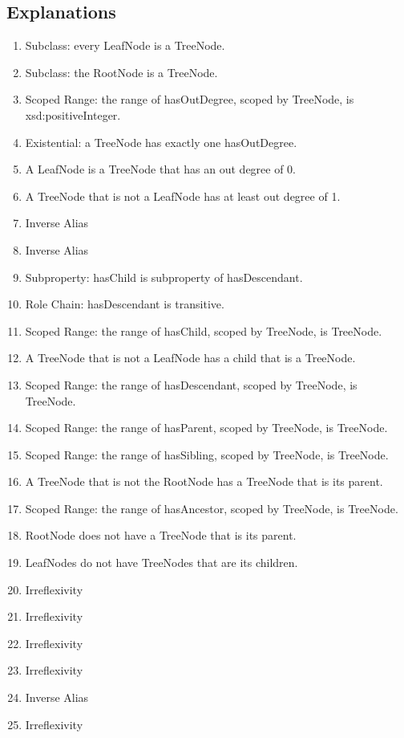 \subsection{Explanations}
\label{exp:Tree}
\begin{enumerate}
\item Subclass: every \textsf{LeafNode} is a \textsf{TreeNode}.
\item Subclass: the \textsf{RootNode} is a \textsf{TreeNode}.
\item Scoped Range: the range of \textsf{hasOutDegree}, scoped by \textsf{TreeNode}, is \textsf{xsd:positiveInteger}.
\item Existential: a \textsf{TreeNode} has exactly one \textsf{hasOutDegree}.
\item A \textsf{LeafNode} is a \textsf{TreeNode} that has an out degree of 0.
\item A \textsf{TreeNode} that is not a \textsf{LeafNode} has at least out degree of 1.
\item Inverse Alias
\item Inverse Alias
\item Subproperty: \textsf{hasChild} is subproperty of \textsf{hasDescendant}.
\item Role Chain: \textsf{hasDescendant} is transitive.
\item Scoped Range: the range of \textsf{hasChild}, scoped by \textsf{TreeNode}, is \textsf{TreeNode}.
\item A \textsf{TreeNode} that is not a \textsf{LeafNode} has a child that is a \textsf{TreeNode}.
\item Scoped Range: the range of \textsf{hasDescendant}, scoped by \textsf{TreeNode}, is \textsf{TreeNode}.
\item Scoped Range: the range of \textsf{hasParent}, scoped by \textsf{TreeNode}, is \textsf{TreeNode}.
\item Scoped Range: the range of \textsf{hasSibling}, scoped by \textsf{TreeNode}, is \textsf{TreeNode}.
\item A \textsf{TreeNode} that is not the \textsf{RootNode} has a \textsf{TreeNode} that is its parent.
\item Scoped Range: the range of \textsf{hasAncestor}, scoped by \textsf{TreeNode}, is \textsf{TreeNode}.
\item \textsf{RootNode} does not have a \textsf{TreeNode} that is its parent.
\item \textsf{LeafNodes} do not have \textsf{TreeNodes} that are its children.
\item Irreflexivity
\item Irreflexivity
\item Irreflexivity
\item Irreflexivity
\item Inverse Alias
\item Irreflexivity
\end{enumerate}

